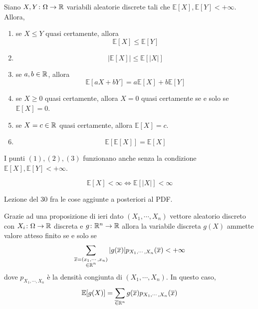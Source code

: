\documentclass[a4paper]{article}
\begin{document}
\begin{snippetproposition}{}
    Siano \(X,Y \colon \Omega \to \mathbb{R}\)
    variabili aleatorie discrete tali che
    \(\mathbb E[X], \mathbb E[Y] < +\infty\).
    Allora,
    \begin{enumerate}
        \item se \(X \leq Y\) quasi certamente, allora
            \[
                \mathbb E[X] \leq \mathbb E[Y]
            \]
        \item \[
                |\mathbb E[X]| \leq \mathbb E[|X|]
            \]
        \item se \(a,b \in \mathbb{R}\), allora
            \[
                \mathbb E[aX + bY] = a\mathbb E[X] + b\mathbb E[Y]
            \]
        \item se \(X \geq 0\) quasi certamente, allora
            \(X = 0\) quasi certamente se e solo se \(\mathbb E[X] = 0\).
        \item se \(X = c \in \mathbb{R}\) quasi certamente, allora
            \(\mathbb E[X] = c\).
        \item \[
                \mathbb E[\mathbb E[X]] = \mathbb E[X]
            \]
    \end{enumerate}
    I punti \((1),(2),(3)\) funzionano anche senza la condizione \(\mathbb E[X], \mathbb E[Y] < +\infty\).
\end{snippetproposition}

\begin{snippetproposition}{}
    \[
        \mathbb E[X] < \infty \iff \mathbb E[|X|] < \infty
    \]
\end{snippetproposition}

\begin{snippetproof}{}
    Lezione del 30 fra le cose aggiunte a posteriori al PDF.
\end{snippetproof}

Grazie ad una proposizione di ieri dato \((X_1, \cdots, X_n)\)
vettore aleatorio discreto con \(X_i \colon \Omega \to \mathbb{R}\)
discreta e \(g \colon \mathbb{R}^n \to \mathbb{R}\)
allora la variabile discreta \(g(X)\) ammette valore atteso finito se e solo se
\[
    \sum_{\substack{\overline x = (x_1, \cdots, x_n) \\ \in \mathbb{R}^n}}
    |g(\overline x)| p_{X_1, \cdots, X_n}(\overline x) < +\infty
\]
dove \(p_{X_1, \cdots, X_n}\) è la densità congiunta di \((X_1, \cdots, X_n)\).
In questo caso,
\[
    \mathbb E[g(X)] = \sum_{\overline \in \mathbb{R}^n} g(\overline x) p_{X_1, \cdots, X_n}(\overline x)
\]
\end{document}
